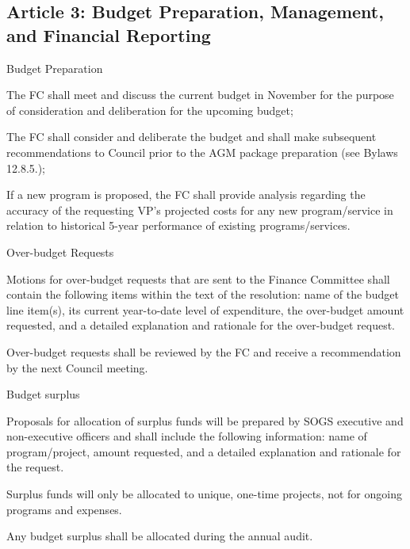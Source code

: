 \subsection{Article 3: Budget Preparation, Management, and Financial Reporting}
\begin{longenum}[ label*=\thesubsection.\arabic*., align=left] 
\item Budget Preparation
	\begin{longenum}[ label*=\arabic*., align=left]
	\item The FC shall meet and discuss the current budget in November for the purpose of consideration and deliberation for the upcoming budget;
	\item The FC shall consider and deliberate the budget and shall make subsequent recommendations to Council prior to the AGM package preparation (see Bylaws 12.8.5.);
	\item If a new program is proposed, the FC shall provide analysis regarding the accuracy of the requesting VP's projected costs for any new program/service in relation to historical 5-year performance of existing programs/services.
	\end{longenum}
\item Over-budget Requests
	\begin{longenum}[ label*=\arabic*., align=left]
	\item Motions for over-budget requests that are sent to the Finance Committee shall contain the following items within the text of the resolution: name of the budget line item(s), its current year-to-date level of expenditure, the over-budget amount requested, and a detailed explanation and rationale for the over-budget request.
	\item Over-budget requests shall be reviewed by the FC and receive a recommendation by the next Council meeting.
	\end{longenum}
\item Budget surplus
	\begin{longenum}[ label*=\arabic*., align=left]
	\item Proposals for allocation of surplus funds will be prepared by SOGS executive and non-executive officers and shall include the following information: name of program/project, amount requested, and a detailed explanation and rationale for the request.
	\item Surplus funds will only be allocated to unique, one-time projects, not for ongoing programs and expenses.
	\item Any budget surplus shall be allocated during the annual audit.

\end{longenum}
\end{longenum}
